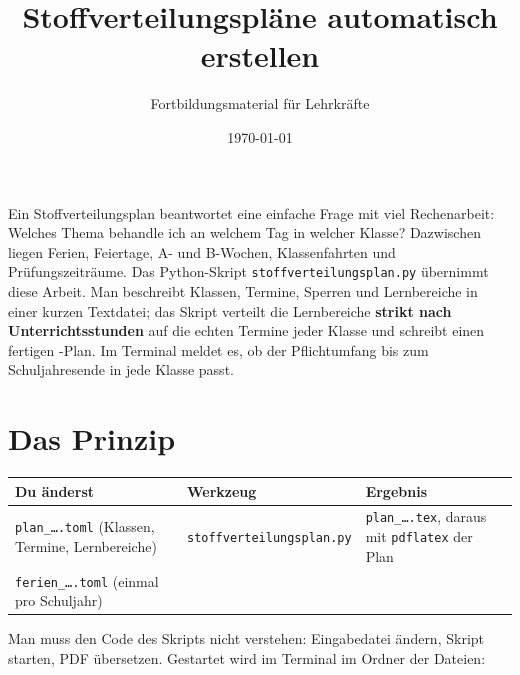 



\title{Stoffverteilungspläne automatisch erstellen}
\author{Fortbildungsmaterial für Lehrkräfte}
\date{\today}
\pagestyle{plain}
\setlength{\parskip}{1.5em} %
\setlength{\emergencystretch}{4em} %




\maketitle

Ein Stoffverteilungsplan beantwortet eine einfache Frage mit viel Rechenarbeit: Welches Thema behandle ich an welchem Tag in welcher Klasse? Dazwischen liegen Ferien, Feiertage, A- und B-Wochen, Klassenfahrten und Prüfungszeiträume. Das Python-Skript \texttt{stoffverteilungsplan.py} übernimmt diese Arbeit. Man beschreibt Klassen, Termine, Sperren und Lernbereiche in einer kurzen Textdatei; das Skript verteilt die Lernbereiche \textbf{strikt nach Unterrichtsstunden} auf die echten Termine jeder Klasse und schreibt einen fertigen -Plan. Im Terminal meldet es, ob der Pflichtumfang bis zum Schuljahresende in jede Klasse passt.

\tableofcontents



\section{Das Prinzip}

\begin{center}
\begin{tabular}{@{}>{\raggedright\arraybackslash}p{4.3cm}>{\raggedright\arraybackslash}p{5.3cm}>{\raggedright\arraybackslash}p{5.4cm}@{}}
	\toprule
	\textbf{Du änderst} & \textbf{Werkzeug} & \textbf{Ergebnis} \\
	\midrule
	\texttt{plan\_\dots.toml} (Klassen, Termine, Lernbereiche) & \texttt{stoffverteilungsplan.py} & \texttt{plan\_\dots.tex}, daraus mit \texttt{pdflatex} der Plan \\
	\texttt{ferien\_\dots.toml} (einmal pro Schuljahr) & & \\
	\bottomrule
\end{tabular}
\end{center}

Man muss den Code des Skripts nicht verstehen: Eingabedatei ändern, Skript starten, PDF übersetzen. Gestartet wird im Terminal im Ordner der Dateien:

